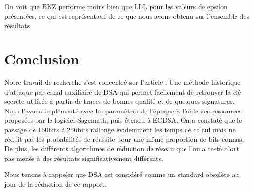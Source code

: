 \documentclass{backend}
\begin{document}
On voit que BKZ performe moins bien que LLL pour les valeurs de epsilon présentées, ce qui est représentatif de ce que nous avons obtenu sur l'ensemble des résultats.


%
%
\newpage
\section{Conclusion}

Notre travail de recherche s'est concentré sur l'article \cite{latAtk}. Une méthode historique d'attaque par canal auxiliaire de DSA qui permet facilement de retrouver la clé secrète utilisée à partir de traces de bonnes qualité et de quelques signatures. Nous l'avons implémenté avec les paramètres de l'époque à l'aide des ressources proposées par le logiciel Sagemath, puis étendu à ECDSA. On a constaté que le passage de 160bits à 256bits rallonge évidemment les temps de calcul mais ne réduit pas les probabilités de réussite pour une même proportion de bits connus. De plus, les différents algorithmes de réduction de réseau que l'on a testé n'ont pas menés à des résultats significativement différents. \medbreak

Nous tenons à rappeler que DSA est considéré comme un standard obsolète au jour de la rédaction de ce rapport. 
\end{document}

